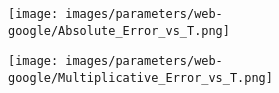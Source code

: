 \begin{figure}[H]
	\centering
	\begin{subfigure}[b]{\textwidth}
		\centering
		\begin{minipage}[b]{0.05\textwidth}
			\centering
		\end{minipage}%
		\begin{minipage}[b]{0.3\textwidth}
			\centering
			\texttt{[image: images/parameters/web-google/Absolute\_Error\_vs\_T.png]} %
			
		\end{minipage}%
		\begin{minipage}[b]{0.3\textwidth}
			\centering
			
			\texttt{[image: images/parameters/web-google/Multiplicative\_Error\_vs\_T.png]} %
			
		\end{minipage}%
		\begin{minipage}[b]{0.3\textwidth}
			\centering
			

\end{minipage}
\end{subfigure}
\end{figure}
